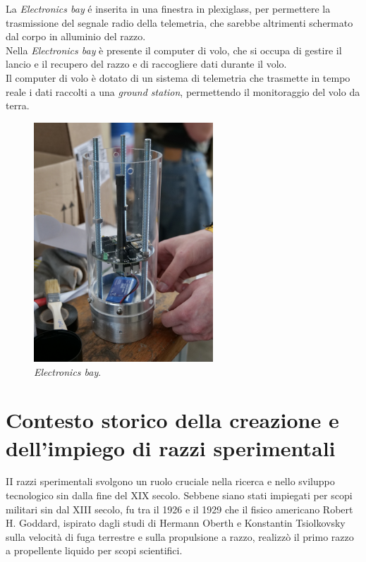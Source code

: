\documentclass[12pt,a4paper,twoside]{book}
\begin{document}
La \emph{Electronics bay} \'e inserita in una finestra in plexiglass, per permettere
la trasmissione del segnale radio della telemetria, che sarebbe altrimenti schermato
dal corpo in alluminio del razzo. \\

Nella \emph{Electronics bay}
è presente il computer di volo, che si occupa di
gestire il lancio e il recupero del razzo e di raccogliere dati durante il volo. \\
Il computer di volo è dotato di un sistema di telemetria che trasmette in tempo
reale i dati raccolti a una \emph{ground station}, permettendo il monitoraggio
del volo da terra.

\begin{figure}[H]
    \centering
    \includegraphics[width=0.6\textwidth]{img/electronics-bay.jpg}
    \caption{\emph{Electronics bay}.}
    \label{fig:electronics-bay}
\end{figure}
\section{Contesto storico della creazione e dell'impiego di razzi sperimentali}
II razzi sperimentali svolgono un ruolo cruciale nella ricerca e nello sviluppo
tecnologico sin dalla fine del XIX secolo.
Sebbene siano stati impiegati per scopi militari sin dal XIII secolo, fu tra il
1926 e il 1929 che il fisico americano Robert H. Goddard, ispirato dagli studi
di Hermann Oberth e Konstantin Tsiolkovsky sulla velocità di fuga terrestre e
sulla propulsione a razzo, realizzò il primo razzo a propellente liquido per
scopi scientifici\cite{seibert2006history}.
\end{document}

